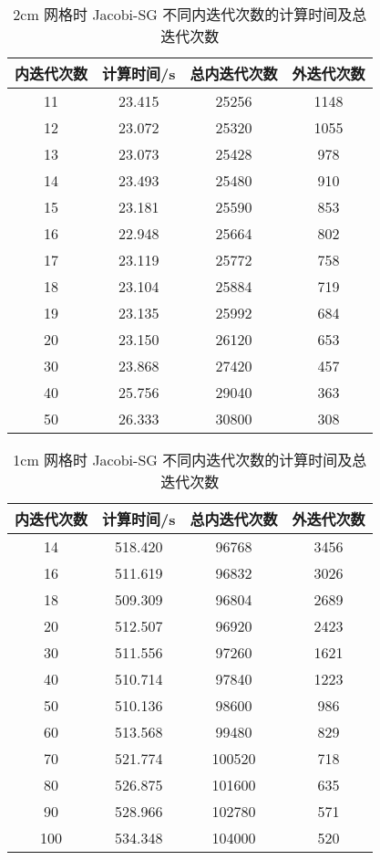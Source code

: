 \begin{datasheet}
\begin{table}
\centering
\caption{2cm 网格时 Jacobi-SG 不同内迭代次数的计算时间及总迭代次数}
\label{tab:equsolve.iter.jacobi-sg.2cm}
\begin{tabular}{cccc}
\toprule
内迭代次数 & 计算时间/s & 总内迭代次数 & 外迭代次数\\
\midrule
11 & 23.415 & 25256 & 1148\\
12 & 23.072 & 25320 & 1055\\
13 & 23.073 & 25428 & 978\\
14 & 23.493 & 25480 & 910\\
15 & 23.181 & 25590 & 853\\
16 & 22.948 & 25664 & 802\\
17 & 23.119 & 25772 & 758\\
18 & 23.104 & 25884 & 719\\
19 & 23.135 & 25992 & 684\\
20 & 23.150 & 26120 & 653\\
30 & 23.868 & 27420 & 457\\
40 & 25.756 & 29040 & 363\\
50 & 26.333 & 30800 & 308\\
\bottomrule
\end{tabular}
\end{table}


\begin{table}
\centering
\caption{1cm 网格时 Jacobi-SG 不同内迭代次数的计算时间及总迭代次数}
\label{tab:equsolve.iter.jacobi-sg.1cm}
\begin{tabular}{cccc}
\toprule
内迭代次数 & 计算时间/s & 总内迭代次数 & 外迭代次数\\
\midrule
14 & 518.420 & 96768 & 3456\\
16 & 511.619 & 96832 & 3026\\
18 & 509.309 & 96804 & 2689\\
20 & 512.507 & 96920 & 2423\\
30 & 511.556 & 97260 & 1621\\
40 & 510.714 & 97840 & 1223\\
50 & 510.136 & 98600 & 986\\
60 & 513.568 & 99480 & 829\\
70 & 521.774 & 100520 & 718\\
80 & 526.875 & 101600 & 635\\
90 & 528.966 & 102780 & 571\\
100 & 534.348 & 104000 & 520\\
\bottomrule
\end{tabular}
\end{table}

\end{datasheet}



